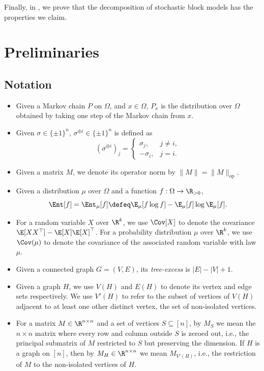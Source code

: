\documentclass[11pt,letterpaper]{article}
\begin{document}
Finally, in , we prove that the decomposition of stochastic block models has the properties we claim.%


\section{Preliminaries}
\label{sec:prelims}

\subsection{Notation}

    \begin{itemize}
        \item Given a Markov chain $P$ on $\Omega$, and $x \in \Omega$, $P_x$ is the distribution over $\Omega$ obtained by taking one step of the Markov chain from $x$.
        \item Given $\sigma \in \{\pm 1\}^n$, $\sigma^{\oplus i} \in \{\pm 1\}^n$ is defined as
        \[ \left(\sigma^{\oplus i}\right)_j = \begin{cases} \sigma_j, & j \ne i, \\ -\sigma_i, & j = i. \end{cases} \]
        \item Given a matrix $M$, we denote its operator norm by $\|M\| = \|M\|_{\mathrm{op}}$.
        \item Given a distribution $\mu$ over $\Omega$ and a function $f : \Omega \to \R_{> 0}$,
        \[ \Ent[f] = \Ent_{\mu}[f] \defeq \E_{\mu}[f \log f] - \E_{\mu}[f] \log \E_{\mu}[f]. \]
        \item For a random variable $X$ over $\R^k$, we use $\Cov[X]$ to denote the covariance $\E[XX^\top] - \E[X]\E[X]^\top$. For a probability distribution $\mu$ over $\R^k$, we use $\Cov(\mu)$ to denote the covariance of the associated random variable with law $\mu$.
        \item Given a connected graph $G = (V,E)$, its \emph{tree-excess} is $|E|-|V|+1$.
        \item Given a graph $H$, we use $V(H)$ and $E(H)$ to denote its vertex and edge sets respectively. We use $V'(H)$ to refer to the subset of vertices of $V(H)$ adjacent to at least one other distinct vertex, the set of non-isolated vertices.
        \item For a matrix $M \in \R^{n \times n}$ and a set of vertices $S \subseteq [n]$, by $M_S$ we mean the $n \times n$ matrix where every row and column outside $S$ is zeroed out, i.e., the principal submatrix of $M$ restricted to $S$ but preserving the dimension. If $H$ is a graph on $[n]$, then by $M_H \in \R^{n \times n}$ we mean $M_{V'(H)}$, i.e., the restriction of $M$ to the non-isolated vertices of $H$.

\end{itemize}
\end{document}

